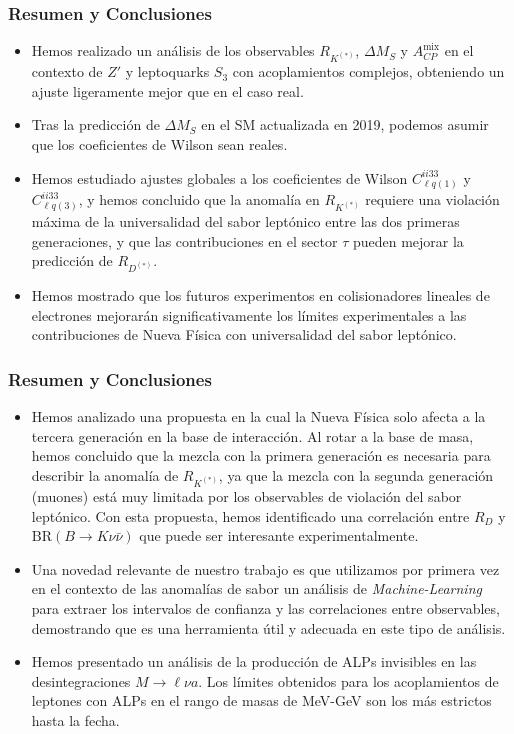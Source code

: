 \documentclass[mathserif, 10pt, dvipsnames]{beamer}
\begin{document}
\begin{frame}\frametitle{Resumen y Conclusiones}
    \begin{itemize}
        \item Hemos realizado un análisis de los observables $R_{K^{(*)}}$, $\Delta M_S$ y $A_{CP}^\mathrm{mix}$ en el contexto de $Z'$ y leptoquarks $S_3$ con acoplamientos complejos, obteniendo un ajuste ligeramente mejor que en el caso real.
        \item Tras la predicción de $\Delta M_S$ en el SM actualizada en 2019, podemos asumir que los coeficientes de Wilson sean reales.
        \item Hemos estudiado ajustes globales a los coeficientes de Wilson $C_{\ell q(1)}^{ii33}$ y $C_{\ell q (3)}^{ii33}$, y hemos concluido que la anomalía en $R_{K^{(*)}}$ requiere una violación máxima de la universalidad del sabor leptónico entre las dos primeras generaciones, y que las contribuciones en el sector $\tau$ pueden mejorar la predicción de $R_{D^{(*)}}$.
        \item Hemos mostrado que los futuros experimentos en colisionadores lineales de electrones mejorarán significativamente los límites experimentales a las contribuciones de Nueva Física con universalidad del sabor leptónico.
    \end{itemize}
\end{frame}

\begin{frame}\frametitle{Resumen y Conclusiones}
    \begin{itemize}
        \item Hemos analizado una propuesta en la cual la Nueva Física solo afecta a la tercera generación en la base de interacción. Al rotar a la base de masa, hemos concluido que la mezcla con la primera generación es necesaria para describir la anomalía de $R_{K^{(*)}}$, ya que la mezcla con la segunda generación (muones) está muy limitada por los observables de violación del sabor leptónico. Con esta propuesta, hemos identificado una correlación entre $R_D$ y $\mathrm{BR}(B\to K\nu\bar{\nu})$ que puede ser interesante experimentalmente.
        \item Una novedad relevante de nuestro trabajo es que utilizamos por primera vez en el contexto de las anomalías de sabor un análisis de \textit{Machine-Learning} para extraer los intervalos de confianza y las correlaciones entre observables, demostrando que es una herramienta útil y adecuada en este tipo de análisis.
        \item Hemos presentado un análisis de la producción de ALPs invisibles en las desintegraciones $M\to \ell \nu a$. Los límites obtenidos para los acoplamientos de leptones con ALPs en el rango de masas de MeV-GeV son los más estrictos hasta la fecha.
    \end{itemize}
\end{frame}
\end{document}

